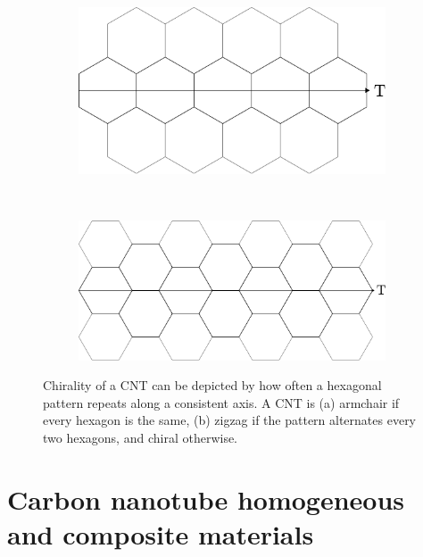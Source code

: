 	\begin{figure}[t!]
		\centering
		\begin{subfigure}[t]{.5\textwidth}
			\centering
			\includegraphics[scale=.25]{./old_fig/Chirality_Armchair.eps}
			\caption{\label{subfig:Armchair}}
		\end{subfigure}%
		~
		\begin{subfigure}[t]{.5\textwidth}
			\centering
			\includegraphics[scale=.25]{./old_fig/Chirality_Zigzag.eps}
			\caption{\label{subfig:Zigzag}}
		\end{subfigure}		
		\caption{Chirality of a CNT can be depicted by how often a hexagonal pattern repeats along a consistent axis. A CNT is (a) armchair if every hexagon is the same, (b) zigzag if the pattern alternates every two hexagons, and chiral otherwise.\label{fig:Chirality}}	
	\end{figure}
	
\section{Carbon nanotube homogeneous and composite materials}
	
